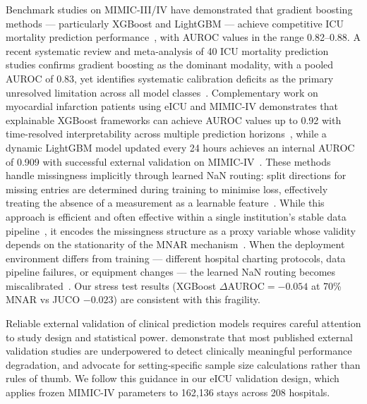 \documentclass[a4paper,fleqn,longmktitle]{cas-sc}
\begin{document}
	Benchmark studies on MIMIC-III/IV have demonstrated that gradient
	boosting methods --- particularly XGBoost and LightGBM --- achieve
	competitive ICU mortality prediction performance~\citep{johnson2016mimic,johnson2023mimic,
		purushotham2018benchmarking}, with AUROC values in the range 0.82--0.88.
	A recent systematic review and meta-analysis of 40 ICU mortality prediction
	studies confirms gradient boosting as the dominant modality, with a pooled
	AUROC of 0.83, yet identifies systematic calibration deficits as the primary
	unresolved limitation across all model classes~\citep{sun2025machinelearning}.
	Complementary work on myocardial infarction patients using eICU and MIMIC-IV
	demonstrates that explainable XGBoost frameworks can achieve AUROC values up
	to 0.92 with time-resolved interpretability across multiple prediction
	horizons~\citep{mesinovic2025explainable}, while a dynamic LightGBM model
	updated every 24 hours achieves an internal AUROC of 0.909 with successful
	external validation on MIMIC-IV~\citep{britsch2025interpretable}.
	These methods handle missingness implicitly through learned
	NaN routing: split directions for missing entries are determined
	during training to minimise loss, effectively treating the absence of a measurement as a
	learnable feature~\citep{chen2016xgboost}.
	While this approach is efficient and often effective within a
	single institution's stable data pipeline~\citep{perezlebel2022benchmarking},
	it encodes the missingness structure as a proxy variable
	whose validity depends on the stationarity of the MNAR
	mechanism~\citep{josse2019consistency,perezlebel2022benchmarking}.
	When the deployment environment differs from training ---
	different hospital charting protocols, data pipeline failures,
	or equipment changes --- the learned NaN routing becomes
	miscalibrated~\citep{sperrin2020informative}.
	Our stress test results (XGBoost $\Delta\text{AUROC} = -0.054$
	at 70\% MNAR vs JUCO $-0.023$) are consistent with this fragility.
	
	Reliable external validation of clinical prediction models requires
	careful attention to study design and statistical power.
	\citet{riley2024external} demonstrate that most published external
	validation studies are underpowered to detect clinically meaningful
	performance degradation, and advocate for setting-specific sample
	size calculations rather than rules of thumb.
	We follow this guidance in our eICU validation design, which applies
	frozen MIMIC-IV parameters to 162,136 stays across 208 hospitals.
	
\end{document}
